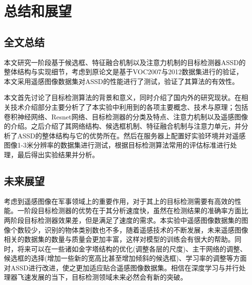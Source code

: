 
\chapter{总结和展望}

\section{全文总结}

本文研究一阶段基于候选框、特征融合机制以及注意力机制的目标检测器ASSD的整体结构与实现细节，考虑到原论文是基于VOC2007与2012数据集进行的验证，本文采用遥感图像数据集对ASSD的性能进行了测试，验证了其算法的有效性。

本文首先讨论了目标检测算法的背景和意义，同时介绍了国内外的研究现状。在相关技术介绍部分主要分析了了本实验中利用到的各项主要概念、技术与原理；包括卷积神经网络、Resnet网络、目标检测器的分类及特点、注意力机制以及遥感图像的介绍。之后介绍了其网络结构、候选框机制、特征融合机制与注意力单元，并分析了ASSD的整体结构与它的优势所在。然后在服务器上配置好实验环境并对遥感图像1-3米分辨率的数据集进行测试，根据目标检测算法常用的评估标准进行处理，最后得出实验结果并分析。


\section{未来展望}
考虑到遥感图像在军事领域上的重要作用，对于其上的目标检测需要有高效的性能。一阶段目标检测器的优势在于其分析速度快，虽然在检测结果的准确率方面比两阶段目标检测器效果差，但是满足了速度的需求。本实验中遥感图像数据集的图像个数较少，识别的物体类别数也不多，随着遥感技术的不断发展，未来遥感图像相关的数据集的数量与质量会更加丰富，这样对模型的训练会有很大的帮助。同时，将来可以在一些诸如金字塔结构的优化(调整各层的尺度)、主干网络的调整、候选框的选择(增加一些新的宽高比甚至增加倾斜的候选框)、学习率的调整等方面对ASSD进行改进，使之更加适应贴合遥感图像数据集。相信在深度学习与并行处理器飞速发展的当下，目标检测领域未来必然会有新的突破。